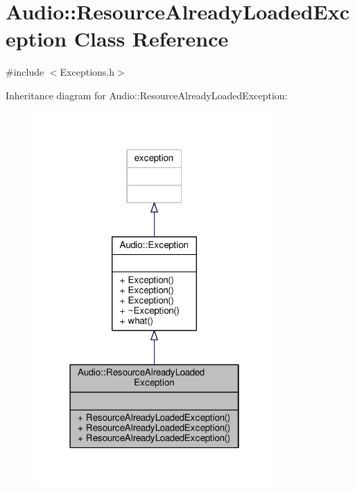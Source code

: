 \hypertarget{classAudio_1_1ResourceAlreadyLoadedException}{}\section{Audio\+:\+:Resource\+Already\+Loaded\+Exception Class Reference}
\label{classAudio_1_1ResourceAlreadyLoadedException}


{\ttfamily \#include $<$Exceptions.\+h$>$}



Inheritance diagram for Audio\+:\+:Resource\+Already\+Loaded\+Exception\+:
\nopagebreak
\begin{figure}[H]
\begin{center}
\leavevmode
\includegraphics[width=262pt]{d8/d0a/classAudio_1_1ResourceAlreadyLoadedException__inherit__graph}
\end{center}
\end{figure}


